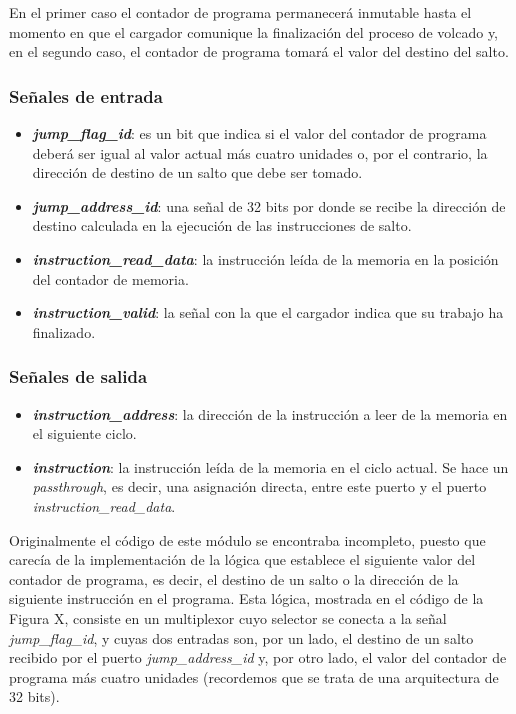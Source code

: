 En el primer caso el contador de programa permanecerá inmutable hasta el momento en que el cargador comunique la finalización del proceso de volcado y, en el segundo caso, el contador de programa tomará el valor del destino del salto.

\subsubsection{Señales de entrada}

\begin{itemize}
  \item \textbf{\textit{jump\_flag\_id}}: es un bit que indica si el valor del contador de programa deberá ser igual al valor actual más cuatro unidades o, por el contrario, la dirección de destino de un salto que debe ser tomado.
  \vspace{-0.2cm}
  \item \textbf{\textit{jump\_address\_id}}: una señal de 32 bits por donde se recibe la dirección de destino calculada en la ejecución de las instrucciones de salto.
  \vspace{-0.2cm}
  \item \textbf{\textit{instruction\_read\_data}}: la instrucción leída de la memoria en la posición del contador de memoria.
  \vspace{-0.2cm}
  \item \textbf{\textit{instruction\_valid}}: la señal con la que el cargador indica que su trabajo ha finalizado.
\end{itemize}

\subsubsection{Señales de salida}

\begin{itemize}
  \item \textbf{\textit{instruction\_address}}: la dirección de la instrucción a leer de la memoria en el siguiente ciclo.
  \vspace{-0.2cm}
  \item \textbf{\textit{instruction}}: la instrucción leída de la memoria en el ciclo actual. Se hace un \textit{passthrough}, es decir, una asignación directa, entre este puerto y el puerto \textit{instruction\_read\_data}.
\end{itemize}

Originalmente el código de este módulo se encontraba incompleto, puesto que carecía de la implementación de la lógica que establece el siguiente valor del contador de programa, es decir, el destino de un salto o la dirección de la siguiente instrucción en el programa. Esta lógica, mostrada en el código de la Figura X, consiste en un multiplexor cuyo selector se conecta a la señal \textit{jump\_flag\_id}, y cuyas dos entradas son, por un lado, el destino de un salto recibido por el puerto \textit{jump\_address\_id} y, por otro lado, el valor del contador de programa más cuatro unidades (recordemos que se trata de una arquitectura de 32 bits).

